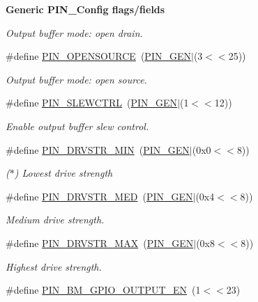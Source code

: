 \begin{Indent}{\bf Generic P\-I\-N\-\_\-\-Config flags/fields}
\begin{DoxyCompactItemize}
\begin{DoxyCompactList}\small\item\em Output buffer mode\-: open drain. \end{DoxyCompactList}\item 
\#define \hyperlink{_p_i_n_8h_a649eb3b178440cda981471c27ff761e5}{P\-I\-N\-\_\-\-O\-P\-E\-N\-S\-O\-U\-R\-C\-E}~(\hyperlink{_p_i_n_8h_ae1f7e47a17caab9697e69e5b9aff270b}{P\-I\-N\-\_\-\-G\-E\-N}$|$(3$<$$<$25))
\begin{DoxyCompactList}\small\item\em Output buffer mode\-: open source. \end{DoxyCompactList}\item 
\#define \hyperlink{_p_i_n_8h_afb6df44a1496358f288b2e90dce81a13}{P\-I\-N\-\_\-\-S\-L\-E\-W\-C\-T\-R\-L}~(\hyperlink{_p_i_n_8h_ae1f7e47a17caab9697e69e5b9aff270b}{P\-I\-N\-\_\-\-G\-E\-N}$|$(1$<$$<$12))
\begin{DoxyCompactList}\small\item\em Enable output buffer slew control. \end{DoxyCompactList}\item 
\#define \hyperlink{_p_i_n_8h_a2a7469e68c23d12b137362dca78a7ae8}{P\-I\-N\-\_\-\-D\-R\-V\-S\-T\-R\-\_\-\-M\-I\-N}~(\hyperlink{_p_i_n_8h_ae1f7e47a17caab9697e69e5b9aff270b}{P\-I\-N\-\_\-\-G\-E\-N}$|$(0x0$<$$<$8))
\begin{DoxyCompactList}\small\item\em ($\ast$) Lowest drive strength \end{DoxyCompactList}\item 
\#define \hyperlink{_p_i_n_8h_aa0c4f9401637a2170b192d5c69faa33b}{P\-I\-N\-\_\-\-D\-R\-V\-S\-T\-R\-\_\-\-M\-E\-D}~(\hyperlink{_p_i_n_8h_ae1f7e47a17caab9697e69e5b9aff270b}{P\-I\-N\-\_\-\-G\-E\-N}$|$(0x4$<$$<$8))
\begin{DoxyCompactList}\small\item\em Medium drive strength. \end{DoxyCompactList}\item 
\#define \hyperlink{_p_i_n_8h_a218e028386e01367f6e86a2a69eb464a}{P\-I\-N\-\_\-\-D\-R\-V\-S\-T\-R\-\_\-\-M\-A\-X}~(\hyperlink{_p_i_n_8h_ae1f7e47a17caab9697e69e5b9aff270b}{P\-I\-N\-\_\-\-G\-E\-N}$|$(0x8$<$$<$8))
\begin{DoxyCompactList}\small\item\em Highest drive strength. \end{DoxyCompactList}\item 
\#define \hyperlink{_p_i_n_8h_a204ca90eb78a0715cca07c95d6b67e65}{P\-I\-N\-\_\-\-B\-M\-\_\-\-G\-P\-I\-O\-\_\-\-O\-U\-T\-P\-U\-T\-\_\-\-E\-N}~(1$<$$<$23)

\end{DoxyCompactItemize}
\end{Indent}

